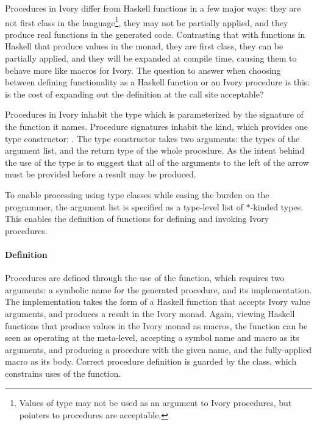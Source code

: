 Procedures in Ivory differ from Haskell functions in a few major ways: they are
not first class in the language\footnote{Values of type  may not be used
as an argument to Ivory procedures, but pointers to procedures are acceptable.},
they may not be partially applied, and they produce real functions in the
generated code.  Contrasting that with functions in Haskell that produce values
in the  monad, they are first class, they can be partially applied,
and they will be expanded at compile time, causing them to behave more like
macros for Ivory.  The question to answer when choosing between defining
functionality as a Haskell function or an Ivory procedure is this: is the cost
of expanding out the definition at the call site acceptable?

Procedures in Ivory inhabit the  type which is parameterized by the
signature of the function it names.  Procedure signatures inhabit the 
kind, which provides one type constructor: \cd{:->}.  The \cd{:->} type
constructor takes two arguments: the types of the argument list, and the return
type of the whole procedure.  As the intent behind the use of the \cd{:->} type
is to suggest that all of the arguments to the left of the arrow must be
provided before a result may be produced.

To enable processing using type classes while easing the burden on the
programmer, the argument list is specified as a type-level list of $*$-kinded
types.  This enables the definition of functions for defining and invoking Ivory
procedures.

\paragraph{Definition}

Procedures are defined through the use of the  function, which requires
two arguments: a symbolic name for the generated procedure, and its
implementation.  The implementation takes the form of a Haskell function that
accepts Ivory value arguments, and produces a result in the Ivory monad.  Again,
viewing Haskell functions that produce values in the Ivory monad as macros, the
 function can be seen as operating at the meta-level, accepting a
symbol name and macro as its arguments, and producing a procedure with the given
name, and the fully-applied macro as its body.  Correct procedure definition is
guarded by the  class, which constrains uses of the 
function.

